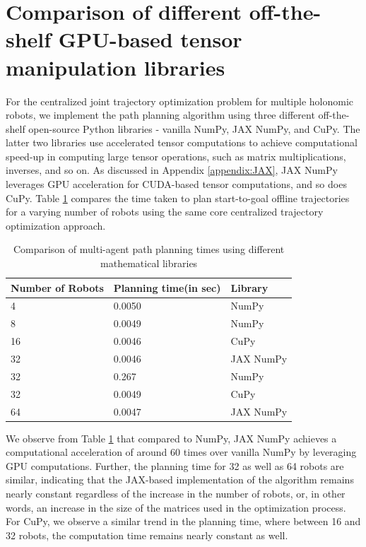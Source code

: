 \section{\label{appendix:GPU-acc-comparison}Comparison of different off-the-shelf GPU-based tensor manipulation libraries}

For the centralized joint trajectory optimization problem for multiple holonomic robots, we implement the path planning algorithm using three different off-the-shelf open-source Python libraries - vanilla NumPy, JAX NumPy, and CuPy. The latter two libraries use accelerated tensor computations to achieve computational speed-up in computing large tensor operations, such as matrix multiplications, inverses, and so on. As discussed in Appendix \ref{appendix:JAX}, JAX NumPy leverages GPU acceleration for CUDA-based tensor computations, and so does CuPy. Table \ref{table: gpu-acc-comp} compares the time taken to plan start-to-goal offline trajectories for a varying number of robots using the same core centralized trajectory optimization approach.

\begin{table}
\centering
\caption{Comparison of multi-agent path planning times using different mathematical libraries} \label{table: gpu-acc-comp}
\scriptsize
\begin{tabular}{|p{3cm}|p{3cm}|p{3cm}|}\hline
 Number of Robots & Planning time(in sec) & Library
\\ \hline
4 & 0.0050 & NumPy
\\ \hline
8 & 0.0049 & NumPy
\\ \hline
16 & 0.0046 & CuPy
\\ \hline
32 & 0.0046 & JAX NumPy
\\ \hline
32 & 0.267 & NumPy
\\ \hline
32 & 0.0049 & CuPy
\\ \hline
64 & 0.0047 & JAX NumPy
\\ \hline
\end{tabular}
\normalsize
\vspace{-0.4cm}
\end{table}

We observe from Table \ref{table: gpu-acc-comp} that compared to NumPy, JAX NumPy achieves a computational acceleration of around $60$ times over vanilla NumPy by leveraging GPU computations. Further, the planning time for 32 as well as 64 robots are similar, indicating that the JAX-based implementation of the algorithm remains nearly constant regardless of the increase in the number of robots, or, in other words, an increase in the size of the matrices used in the optimization process. For CuPy, we observe a similar trend in the planning time, where between 16 and 32 robots, the computation time remains nearly constant as well. 

